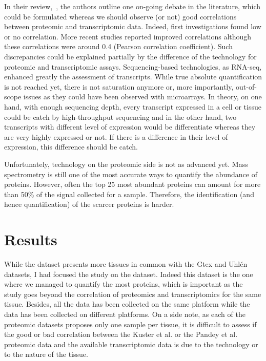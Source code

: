 In their review,~\cite{Uhlen:2016}, the authors outline one on-going debate
in the literature, which could be formulated whereas we should observe (or not) good
correlations between proteomic and transcriptomic data.
Indeed, first investigations found low or no correlation. More recent
studies reported improved correlations although these correlations were around
0.4 (Pearson correlation coefficient). Such discrepancies could be explained
partially by the difference of the technology for proteomic and transcriptomic
assays. Sequencing-based technologies, as RNA-seq, enhanced greatly the assessment
of transcripts. While true absolute quantification is not reached yet, there is
not saturation anymore or, more importantly, out-of-scope issues as they could
have been observed with microarrays. In theory, on one hand, with enough
sequencing depth, every transcript expressed in a cell or tissue could be catch
by high-throughput sequencing and in the other hand, two transcripts with different
level of expression would be differentiate  whereas they are very highly expressed
or not. If there is a difference in their level of expression, this difference
should be catch.

Unfortunately, technology on the proteomic side is not as advanced yet.
Mass spectrometry is still one of the most accurate ways to quantify the abundance
of proteins. However, often the top 25 most abundant proteins can amount for more 
than 50\% of the signal collected for a sample. Therefore, the identification (and
hence quantification) of the scarcer proteins is harder.

\begin{comment}
\begin{quote}The correlation between \mRNA\ levels and the corresponding protein levels
    is an important issues for the comparability of the different omics-based technologies, and
    the presence or absence of such correlation on an individual gene/protein level has
    been debated in the literature for many years.
\end{quote}
\end{comment}

\section{Results}
\label{sec:IntegrationResults}
While the  dataset presents more tissues in common with the Gtex and Uhlén
datasets, I had focused the study on the  dataset.
Indeed this dataset is the one where we managed to quantify the most proteins,
which is important as the study goes beyond the correlation of proteomics and
transcriptomics for the same tissue. Besides, all the  data has been
collected on the same platform while the  data has been collected on
different platforms. On a side note, as each of the proteomic datasets proposes
only one sample per tissue, it is difficult to assess if the good or bad
correlation between the Kuster et al. or the Pandey et al. proteomic data
and the available transcriptomic data is due to the technology or
to the nature of the tissue.

